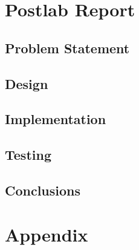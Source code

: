 \documentclass{article}
\begin{document}
\section*{Postlab Report}

\subsection*{Problem Statement}

\subsection*{Design}

\subsection*{Implementation}

\subsection*{Testing}

\subsection*{Conclusions}

\section*{Appendix}
\end{document}
